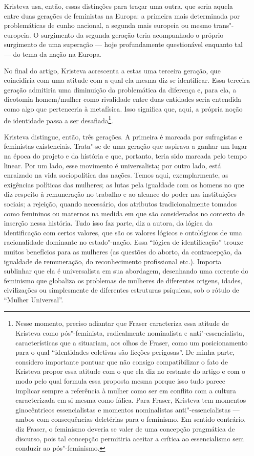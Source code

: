 Kristeva usa, então, essas distinções para traçar uma outra, que seria
aquela entre duas gerações de feministas na Europa: a primeira mais
determinada por problemáticas de cunho nacional, a segunda mais europeia
ou mesmo trans"-europeia. O surgimento da segunda geração teria
acompanhado o próprio surgimento de uma superação --- hoje profundamente
questionável enquanto tal --- do tema da nação na Europa.

No final do artigo, Kristeva acrescenta a estas uma terceira geração,
que coincidiria com uma atitude com a qual ela mesma diz se identificar.
Essa terceira geração admitiria uma diminuição da problemática da
diferença e, para ela, a dicotomia homem/mulher como rivalidade entre
duas entidades seria entendida como algo que pertenceria à metafísica.
Isso significa que, aqui, a própria noção de identidade passa a ser
desafiada\footnote{Nesse momento, preciso adiantar que Fraser
  caracteriza essa atitude de Kristeva como pós"-feminista, radicalmente
  nominalista e anti"-essencialista, características que a situariam, aos
  olhos de Fraser, como um posicionamento para o qual ``identidades
  coletivas são ficções perigosas''. De minha parte, considero
  importante pontuar que não consigo compatibilizar o fato de Kristeva
  propor essa atitude com o que ela diz no restante do artigo e com o
  modo pelo qual formula essa proposta mesma porque isso tudo parece
  implicar sempre a referência à mulher como ser em conflito com a
  cultura caracterizada em si mesma como fálica. Para Fraser, Kristeva
  tem momentos ginocêntricos essencialistas e momentos nominalistas
  anti"-essencialistas --- ambos com consequências deletérias para o
  feminismo. Em sentido contrário, diz Fraser, o feminismo deveria se
  valer de uma concepção pragmática de discurso, pois tal concepção
  permitiria aceitar a crítica ao essencialismo sem conduzir ao
  pós"-feminismo.}.

Kristeva distingue, então, três gerações. A primeira é marcada por
sufragistas e feministas existenciais. Trata"-se de uma geração que
aspirava a ganhar um lugar na época do projeto e da história e que,
portanto, teria sido marcada pelo tempo linear. Por um lado, esse
movimento é universalista; por outro lado, está enraizado na vida
sociopolítica das nações. Temos aqui, exemplarmente, as exigências
políticas das mulheres; as lutas pela igualdade com os homens no que diz
respeito à remuneração no trabalho e ao alcance do poder nas
instituições sociais; a rejeição, quando necessário, dos atributos
tradicionalmente tomados como femininos ou maternos na medida em que são
considerados no contexto de inserção nessa história. Tudo isso faz
parte, diz a autora, da lógica da identificação com certos valores, que
são os valores lógicos e ontológicos de uma racionalidade dominante no
estado"-nação. Essa ``lógica de identificação'' trouxe muitos benefícios
para as mulheres (as questões do aborto, da contracepção, da igualdade
de remuneração, do reconhecimento profissional etc.). Importa sublinhar
que ela é universalista em sua abordagem, desenhando uma corrente do
feminismo que globaliza os problemas de mulheres de diferentes origens,
idades, civilizações ou simplesmente de diferentes estruturas psíquicas,
sob o rótulo de ``Mulher Universal''.

